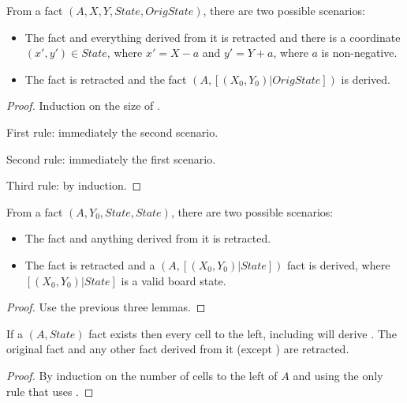 \begin{lemma}
From a fact $(A, X, Y, State, OrigState)$, there are
two possible scenarios:

\begin{itemize}
   \item The  fact and everything derived from it is
      retracted and there is a coordinate $(x', y') \in State$, where $x' = X -
      a$ and $y' = Y + a$, where $a$ is non-negative.
   \item The  fact is retracted and the fact
      $(A, [(X_0, Y_0) | OrigState])$ is derived.
\end{itemize}
\end{lemma}

\begin{proof}
Induction on the size of .

First rule: immediately the second scenario.

Second rule: immediately the first scenario.

Third rule: by induction.
\end{proof}

\begin{theorem}
From a fact $(A, Y_0, State, State)$, there are two possible
scenarios:
   
   \begin{itemize}
      \item The  fact and anything derived from it is retracted.
      \item The  fact is retracted and a $(A,
         [(X_0, Y_0) | State])$ fact is derived, where $[(X_0, Y_0) | State]$ is
         a valid board state.
   \end{itemize}
\end{theorem}
\begin{proof}
Use the previous three lemmas.
\end{proof}

\begin{lemma}
If a $(A, State)$ fact exists then every cell to the left,
including  will derive . The original
 fact and any other fact derived from it (except
) are retracted.
\end{lemma}
\begin{proof}

By induction on the number of cells to the left of $A$ and using the only rule
that uses .

\end{proof}

